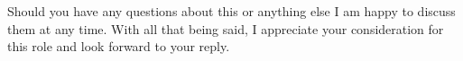 \documentclass[11pt,a4paper,sans]{moderncv}        %
\begin{document}
Should you have any questions about this or anything else I am happy to discuss them at any time. With all that being said, I appreciate your consideration for this role and look forward to your reply.

\makeletterclosing

\end{document}
